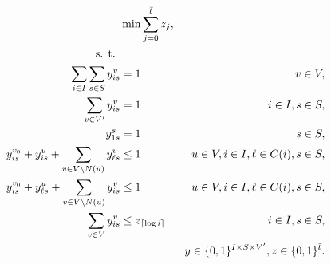 \begin{subequations}\label{mod:partition}
\begin{align}
\notag &\min\sum\limits_{j=0}^{\bar{t}}z_j,\\
\notag \text{s. t. } \\
\label{mod:part:nodeBelongs} \sum\limits_{i\in I}\sum\limits_{s\in S}y^v_{is} & = 1 & v\in V,\\
\label{mod:part:treeHasIJ} \sum\limits_{v\in V'}y^v_{is} & = 1 & i\in I,s\in S,\\
\label{mod:part:source1} y_{1s}^s & = 1  & s\in S,\\
\label{mod:part:followArcsA}y^{v_0}_{is}+y^u_{i s} + \sum\limits_{v\in V\setminus N(u)}y^v_{\ell s}&\leq 1 & u\in V,i\in I,\ell\in C(i), s\in S,  \\
\label{mod:part:followArcsB}y^{v_0}_{is}+y^u_{\ell s} + \sum\limits_{v\in V\setminus N(u)}y^v_{i s}&\leq 1 & u\in V,i\in I,\ell\in C(i), s\in S,\\ 
\label{mod:part:yzrel}\sum\limits_{v\in V}y^v_{is} & \leq z_{\lceil\log i\rceil} & i\in I,s\in S,\\
\label{mod:part:dim}&&y \in \{0,1\}^{I\times S\times V'}, z\in \{0,1\}^{\bar{t}}.
\end{align}~
\end{subequations}

